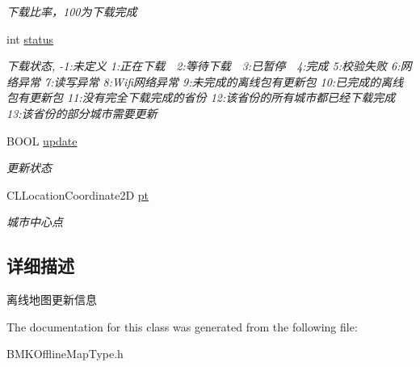 \begin{DoxyCompactItemize}
\begin{DoxyCompactList}\small\item\em 下载比率，100为下载完成 \end{DoxyCompactList}\item 
\hypertarget{interface_b_m_k_o_l_update_element_a1e980d13929fc0dc732edddf1ae13bf2}{int \hyperlink{interface_b_m_k_o_l_update_element_a1e980d13929fc0dc732edddf1ae13bf2}{status}}\label{interface_b_m_k_o_l_update_element_a1e980d13929fc0dc732edddf1ae13bf2}

\begin{DoxyCompactList}\small\item\em 下载状态, -\/1\-:未定义 1\-:正在下载　2\-:等待下载　3\-:已暂停　4\-:完成 5\-:校验失败 6\-:网络异常 7\-:读写异常 8\-:Wifi网络异常 9\-:未完成的离线包有更新包 10\-:已完成的离线包有更新包 11\-:没有完全下载完成的省份 12\-:该省份的所有城市都已经下载完成 13\-:该省份的部分城市需要更新 \end{DoxyCompactList}\item 
\hypertarget{interface_b_m_k_o_l_update_element_a1adc137eba11d9ae142310d3556bc446}{B\-O\-O\-L \hyperlink{interface_b_m_k_o_l_update_element_a1adc137eba11d9ae142310d3556bc446}{update}}\label{interface_b_m_k_o_l_update_element_a1adc137eba11d9ae142310d3556bc446}

\begin{DoxyCompactList}\small\item\em 更新状态 \end{DoxyCompactList}\item 
\hypertarget{interface_b_m_k_o_l_update_element_a9e229b507ced476146db8f80c71ea5bd}{C\-L\-Location\-Coordinate2\-D \hyperlink{interface_b_m_k_o_l_update_element_a9e229b507ced476146db8f80c71ea5bd}{pt}}\label{interface_b_m_k_o_l_update_element_a9e229b507ced476146db8f80c71ea5bd}

\begin{DoxyCompactList}\small\item\em 城市中心点 \end{DoxyCompactList}\end{DoxyCompactItemize}


\subsection{详细描述}
离线地图更新信息 

The documentation for this class was generated from the following file\-:\begin{DoxyCompactItemize}
\item 
B\-M\-K\-Offline\-Map\-Type.\-h\end{DoxyCompactItemize}
